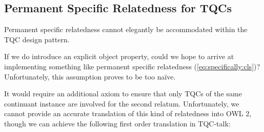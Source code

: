 

\subsection*{Permanent Specific Relatedness for TQCs}
Permanent specific relatedness cannot elegantly be accommodated within the TQC design pattern. 

If we do introduce an explicit object property, could we hope to arrive at
implementing something like permanent specific relatedness
(\ref{eq:specifically:cls})? Unfortunately, this assumption proves to be too na\"ive.

It would require an additional axiom to ensure that only TQCs of the same continuant instance are involved
for the second relatum. Unfortunately, we cannot provide an
accurate translation of this kind of relatedness into OWL 2, though we can
achieve the following first order translation in TQC-talk:

